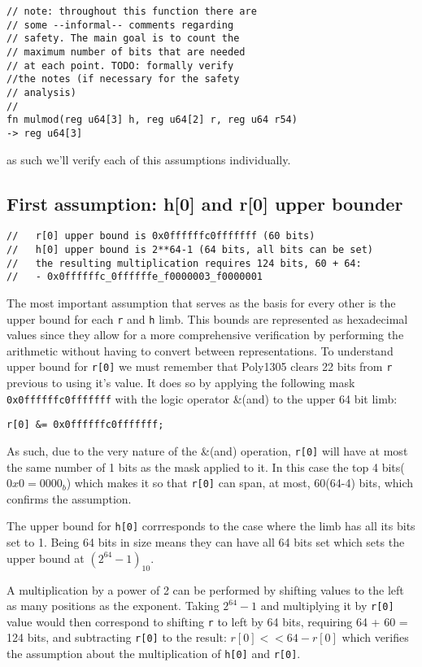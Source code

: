 \documentclass{article}
\begin{document}
\begin{Verbatim}[fontsize=\footnotesize]
// note: throughout this function there are 
// some --informal-- comments regarding
// safety. The main goal is to count the 
// maximum number of bits that are needed
// at each point. TODO: formally verify 
//the notes (if necessary for the safety
// analysis)
//
fn mulmod(reg u64[3] h, reg u64[2] r, reg u64 r54) 
-> reg u64[3]
\end{Verbatim}

as such we'll verify each of this assumptions individually.

\subsection{First assumption: h[0] and r[0] upper bounder}
\begin{Verbatim}[fontsize=\footnotesize]
//   r[0] upper bound is 0x0ffffffc0fffffff (60 bits)
//   h[0] upper bound is 2**64-1 (64 bits, all bits can be set)
//   the resulting multiplication requires 124 bits, 60 + 64:
//   - 0x0ffffffc_0ffffffe_f0000003_f0000001
\end{Verbatim}
The most important assumption that serves as the basis for every other is the upper bound for each \texttt{r} and \texttt{h} limb. 
This bounds are represented as hexadecimal values since they allow for a more comprehensive verification by performing the arithmetic without
having to convert between representations. 
To understand upper bound for \texttt{r[0]} we must remember that Poly1305 clears 22 bits from \texttt{r} previous to using it's value. It does so by applying 
the following mask \texttt{0x0ffffffc0fffffff} with the logic operator \&(and) to the upper 64 bit limb: 
\begin{Verbatim}[fontsize=\footnotesize]
r[0] &= 0x0ffffffc0fffffff;
\end{Verbatim}
As such, due to the very nature of the \&(and) operation, \texttt{r[0]} will have at most the same number of 1 bits as the mask applied to it. In this case 
the top 4 bits($0x0=0000_b$) which makes it so that \texttt{r[0]} can span, at most, 60(64-4) bits, which confirms the assumption.

The upper bound for \texttt{h[0]} corrresponds to the case where the limb has all its bits set to 1. Being 64 bits in size means they can have all 64 bits 
set which sets the upper bound at $(2^{64}-1)_{10}$. 

A multiplication by a power of 2 can be performed by shifting values to the left as many positions as the exponent. Taking $2^{64}-1$ and multiplying it by
\texttt{r[0]} value would then correspond to shifting \texttt{r} to left by 64 bits, requiring 64 + 60 = 124 bits, and subtracting \texttt{r[0]} to the result:
$r[0]<<64 - r[0]$ which verifies the assumption about the multiplication of \texttt{h[0]} and \texttt{r[0]}.
\end{document}
